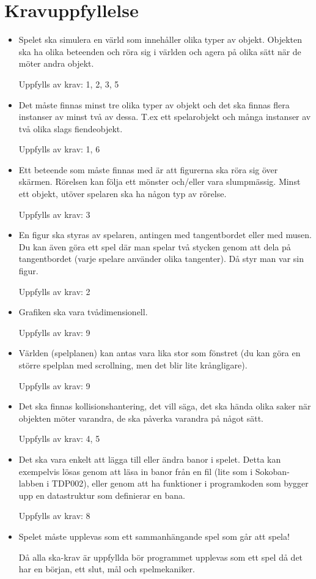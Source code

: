 \documentclass{TDP005mall}
\begin{document}
\section{Kravuppfyllelse}
\begin{itemize}
\item Spelet ska simulera en värld som innehåller olika typer av objekt. Objekten ska ha olika beteenden och röra sig i världen och agera på olika sätt när de möter andra objekt.

Uppfylls av krav: 1, 2, 3, 5
\item Det måste finnas minst tre olika typer av objekt och det ska finnas flera instanser av minst två av dessa. T.ex ett spelarobjekt och många instanser av två olika slags fiendeobjekt.

Uppfylls av krav: 1, 6
\item Ett beteende som måste finnas med är att figurerna ska röra sig över skärmen. Rörelsen kan följa ett mönster och/eller vara slumpmässig. Minst ett objekt, utöver spelaren ska ha någon typ av rörelse.

Uppfylls av krav: 3
\item En figur ska styras av spelaren, antingen med tangentbordet eller med musen. Du kan även göra ett spel där man spelar två stycken genom att dela på tangentbordet (varje spelare använder olika tangenter). Då styr man var sin figur.

Uppfylls av krav: 2
\item Grafiken ska vara tvådimensionell.

Uppfylls av krav: 9
\item Världen (spelplanen) kan antas vara lika stor som fönstret (du kan göra en större spelplan med scrollning, men det blir lite krångligare).

Uppfylls av krav: 9
\item Det ska finnas kollisionshantering, det vill säga, det ska hända olika saker när objekten möter varandra, de ska påverka varandra på något sätt. 

Uppfylls av krav: 4, 5
\item Det ska vara enkelt att lägga till eller ändra banor i spelet. Detta kan exempelvis lösas genom att läsa in banor från en fil (lite som i Sokoban-labben i TDP002), eller genom att ha funktioner i programkoden som bygger upp en datastruktur som definierar en bana.

Uppfylls av krav: 8
\item Spelet måste upplevas som ett sammanhängande spel som går att spela!

Då alla ska-krav är uppfyllda bör programmet upplevas som ett spel då det har en början, ett slut, mål och spelmekaniker. 
\end{itemize}
\end{document}
